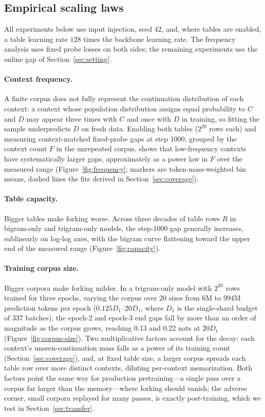 \subsection{Empirical scaling laws}
\label{sec:forking-factors}

All experiments below use input injection, seed 42, and, where tables are enabled, a table learning rate $128$ times the backbone learning rate. The frequency analysis uses fixed probe losses on both sides; the remaining experiments use the online gap of Section~\ref{sec:setting}.

\paragraph{Context frequency.}
A finite corpus does not fully represent the continuation distribution of each context: a context whose population distribution assigns equal probability to $C$ and $D$ may appear three times with $C$ and once with $D$ in training, so fitting the sample underpredicts $D$ on fresh data. Enabling both tables ($2^{20}$ rows each) and measuring context-matched fixed-probe gaps at step 1000, grouped by the context count $F$ in the unrepeated corpus, shows that low-frequency contexts have systematically larger gaps, approximately as a power law in $F$ over the measured range (Figure~\ref{fig:frequency}; markers are token-mass-weighted bin means, dashed lines the fits derived in Section~\ref{sec:coverage}).

\paragraph{Table capacity.}
Bigger tables make forking worse. Across three decades of table rows $R$ in bigram-only and trigram-only models, the step-1000 gap generally increases, sublinearly on log-log axes, with the bigram curve flattening toward the upper end of the measured range (Figure~\ref{fig:capacity}).

\paragraph{Training corpus size.}
Bigger corpora make forking milder. In a trigram-only model with $2^{20}$ rows trained for three epochs, varying the corpus over 20 sizes from 6M to 994M prediction tokens per epoch ($0.125D_1$--$20D_1$, where $D_1$ is the single-shard budget of 337 batches), the epoch-2 and epoch-3 end gaps fall by more than an order of magnitude as the corpus grows, reaching 0.13 and 0.22 nats at $20D_1$ (Figure~\ref{fig:corpus-size}). Two multiplicative factors account for the decay: each context's unseen-continuation mass falls as a power of its training count (Section~\ref{sec:coverage}), and, at fixed table size, a larger corpus spreads each table row over more distinct contexts, diluting per-context memorization. Both factors point the same way for production pretraining---a single pass over a corpus far larger than the memory---where forking should vanish; the adverse corner, small corpora replayed for many passes, is exactly post-training, which we test in Section~\ref{sec:transfer}.


